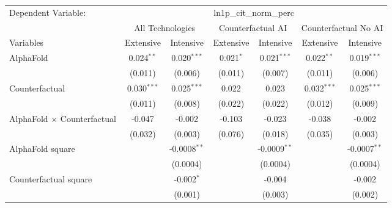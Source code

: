 \begingroup
\centering
\begin{tabular}{lcccccc}
   \tabularnewline \midrule \midrule
   Dependent Variable: & \multicolumn{6}{c}{ln1p\_cit\_norm\_perc}\\
 & \multicolumn{2}{c}{All Technologies} & \multicolumn{2}{c}{Counterfactual AI} & \multicolumn{2}{c}{Counterfactual No AI} \\
\cmidrule(lr){1-1}\cmidrule(lr){2-3} \cmidrule(lr){4-5} \cmidrule(lr){6-7}
Variables & \multicolumn{1}{c}{Extensive} & \multicolumn{1}{c}{Intensive} & \multicolumn{1}{c}{Extensive} & \multicolumn{1}{c}{Intensive} & \multicolumn{1}{c}{Extensive} & \multicolumn{1}{c}{Intensive} \\
\cmidrule(lr){1-1}\cmidrule(lr){2-2} \cmidrule(lr){3-3} \cmidrule(lr){4-4} \cmidrule(lr){5-5} \cmidrule(lr){6-6} \cmidrule(lr){7-7}
   AlphaFold                          & 0.024$^{**}$  & 0.020$^{***}$  & 0.021$^{*}$ & 0.021$^{***}$  & 0.022$^{**}$  & 0.019$^{***}$\\   
                                      & (0.011)       & (0.006)        & (0.011)     & (0.007)        & (0.011)       & (0.006)\\   
   Counterfactual                     & 0.030$^{***}$ & 0.025$^{***}$  & 0.022       & 0.023          & 0.032$^{***}$ & 0.025$^{***}$\\   
                                      & (0.011)       & (0.008)        & (0.022)     & (0.022)        & (0.012)       & (0.009)\\   
   AlphaFold $\times$ Counterfactual  & -0.047        & -0.002         & -0.103      & -0.023         & -0.038        & -0.002\\   
                                      & (0.032)       & (0.003)        & (0.076)     & (0.018)        & (0.035)       & (0.003)\\   
   AlphaFold square                   &               & -0.0008$^{**}$ &             & -0.0009$^{**}$ &               & -0.0007$^{**}$\\   
                                      &               & (0.0004)       &             & (0.0004)       &               & (0.0004)\\   
   Counterfactual square              &               & -0.002$^{*}$   &             & -0.004         &               & -0.002\\   
                                      &               & (0.001)        &             & (0.003)        &               & (0.002)\\   

\end{tabular}
